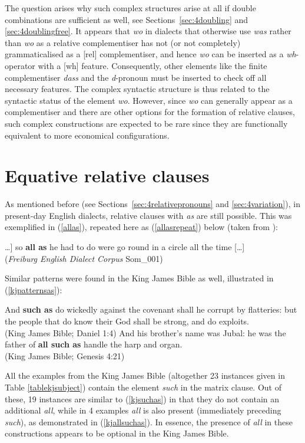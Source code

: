 The question arises why such complex structures arise at all if double combinations are sufficient as well, see Sections~\ref{sec:4doubling} and \ref{sec:4doublingfree}. It appears that \textit{wo} in dialects that otherwise use \textit{was} rather than \textit{wo} as a relative complementiser has not (or not completely) grammaticalised as a [rel] complementiser, and hence \textit{wo} can be inserted as a \textit{wh}-operator with a [wh] feature. Consequently, other elements like the finite complementiser \textit{dass} and the \textit{d}-pronoun must be inserted to check off all necessary features. The complex syntactic structure is thus related to the syntactic status of the element \textit{wo}. However, since \textit{wo} can generally appear as a complementiser and there are other options for the formation of relative clauses, such complex constructions are expected to be rare since they are functionally equivalent to more economical configurations.

\section{Equative relative clauses} \label{sec:4equative}
As mentioned before (see Sections~\ref{sec:4relativepronouns} and \ref{sec:4variation}), in present-day English dialects, relative clauses with \textit{as} are still possible. This was exemplified in (\ref{allas}), repeated here as (\ref{allasrepeat}) below (taken from \citealt[64, ex. 26d]{herrmann2005}):

\ea {[}\ldots] so \textbf{all as} he had to do were go round in a circle all the time [\ldots] \label{allasrepeat}\\
(\textit{Freiburg English Dialect Corpus} Som\_001)
\z

Similar patterns were found in the King James Bible as well, illustrated in (\ref{kjpatternsas}):

\ea \label{kjpatternsas}
\ea And \textbf{such as} do wickedly against the covenant shall he corrupt by flatteries: but the people that do know their God shall be strong, and do exploits. \label{kjsuchas}\\(King James Bible; Daniel 1:4) 
\ex And his brother's name was Jubal: he was the father of \textbf{all such as} handle the harp and organ. \label{kjallsuchas}\\(King James Bible; Genesis 4:21) 
\z
\z

All the examples from the King James Bible (altogether 23 instances given in Table \ref{tablekjsubject}) contain the element \textit{such} in the matrix clause. Out of these, 19 instances are similar to (\ref{kjsuchas}) in that they do not contain an additional \textit{all}, while in 4 examples \textit{all} is also present (immediately preceding \textit{such}), as demonstrated in (\ref{kjallsuchas}). In essence, the presence of \textit{all} in these constructions appears to be optional in the King James Bible.

